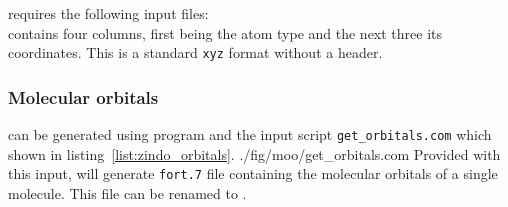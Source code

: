 \moo requires the following input files: \\
\noindent
\xyz contains four columns, first being the atom type and the next three its coordinates. This is a standard \texttt{xyz} format without a header. 
\vskip 0.1cm
\noindent

\subsubsection{Molecular orbitals}
\orb can be generated using \gaussian program and the input script \texttt{get\_orbitals.com} which shown in listing~\ref{list:zindo_orbitals}.
\vskip 0.1cm
\noindent
%
{./fig/moo/get_orbitals.com}
%
Provided with this input, \gaussian will generate \texttt{fort.7} file containing the molecular orbitals of a single molecule. This file can be renamed to \orb. 

